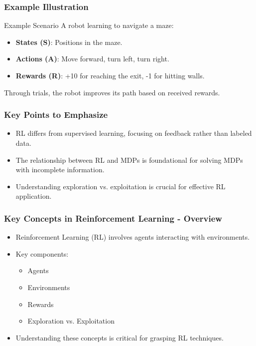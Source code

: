 \documentclass[aspectratio=169]{beamer}
\begin{document}
\begin{frame}[fragile]
    \frametitle{Example Illustration}
    \begin{block}{Example Scenario}
        A robot learning to navigate a maze:
        \begin{itemize}
            \item \textbf{States (S)}: Positions in the maze.
            \item \textbf{Actions (A)}: Move forward, turn left, turn right.
            \item \textbf{Rewards (R)}: +10 for reaching the exit, -1 for hitting walls.
        \end{itemize}
        Through trials, the robot improves its path based on received rewards.
    \end{block}
\end{frame}

\begin{frame}[fragile]
    \frametitle{Key Points to Emphasize}
    \begin{itemize}
        \item RL differs from supervised learning, focusing on feedback rather than labeled data.
        \item The relationship between RL and MDPs is foundational for solving MDPs with incomplete information.
        \item Understanding exploration vs. exploitation is crucial for effective RL application.
    \end{itemize}
\end{frame}

\begin{frame}[fragile]
  \frametitle{Key Concepts in Reinforcement Learning - Overview}
  \begin{itemize}
    \item Reinforcement Learning (RL) involves agents interacting with environments.
    \item Key components:
      \begin{itemize}
        \item Agents
        \item Environments
        \item Rewards
        \item Exploration vs. Exploitation
      \end{itemize}
    \item Understanding these concepts is critical for grasping RL techniques.
  \end{itemize}
\end{frame}
\end{document}
